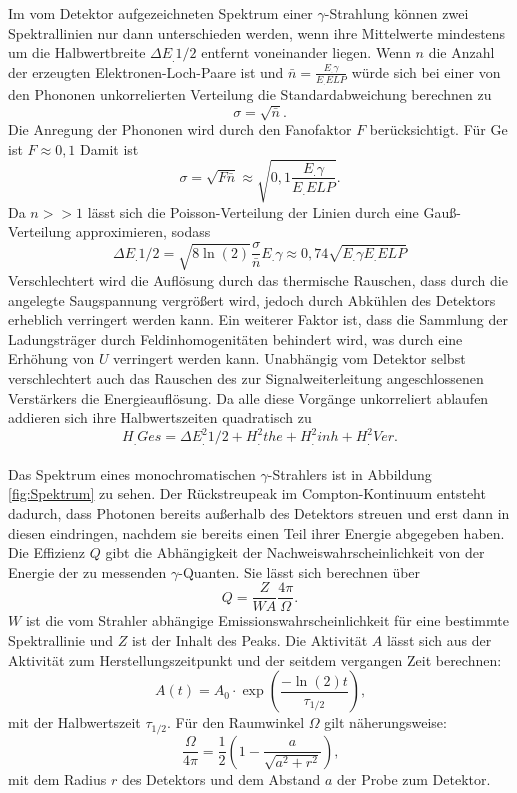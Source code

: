Im vom Detektor aufgezeichneten Spektrum einer $\gamma$-Strahlung können zwei Spektrallinien nur dann unterschieden werden, wenn ihre Mittelwerte mindestens um die Halbwertbreite $\Delta E_.{1/2}$ entfernt voneinander liegen.
Wenn $n$ die Anzahl der erzeugten Elektronen-Loch-Paare ist und $\bar{n}=\frac{E_.{\gamma}}{E_.{ELP}}$ würde sich bei einer von den Phononen unkorrelierten Verteilung die Standardabweichung berechnen zu
\[
\sigma=\sqrt{\bar{n}}\text{.}
\]
Die Anregung der Phononen wird durch den Fanofaktor $F$ berücksichtigt. Für Ge ist $F\approx 0,1$
Damit ist 
\[
\sigma=\sqrt{F\bar{n}}\approx\sqrt{0,1\frac{E_.{\gamma}}{E_.{ELP}}}\text{.}\label{eq:sig}
\]
Da $n>>1$ lässt sich die Poisson-Verteilung der Linien durch eine Gauß-Verteilung approximieren, sodass
\begin{equation}
\Delta E_.{1/2}=\sqrt{8\ln(2)}\frac{\sigma}{\bar{n}}E_.{\gamma}\approx 0,74\sqrt{E_.{\gamma}E_.{ELP}}\label{eq:dE}
\end{equation}
Verschlechtert wird die Auflösung durch das thermische Rauschen, dass durch die angelegte Saugspannung vergrößert wird, jedoch durch Abkühlen des Detektors erheblich verringert werden kann. Ein weiterer Faktor ist, dass die Sammlung der Ladungsträger durch Feldinhomogenitäten behindert wird, was durch eine Erhöhung von $U$ verringert werden kann. Unabhängig vom Detektor selbst verschlechtert auch das Rauschen des zur Signalweiterleitung angeschlossenen Verstärkers die Energieauflösung. Da alle diese Vorgänge unkorreliert ablaufen addieren sich ihre Halbwertszeiten quadratisch zu
\begin{equation}
H_.{Ges}=\Delta E^2_.{1/2} + H^2_.{the} + H^2_.{inh} + H^2_.{Ver}\text{.}
\end{equation}
\\
Das Spektrum eines monochromatischen $\gamma$-Strahlers ist in Abbildung \ref{fig:Spektrum} zu sehen.
Der Rückstreupeak im Compton-Kontinuum entsteht dadurch, dass Photonen bereits außerhalb des Detektors streuen und erst dann in diesen eindringen, nachdem sie bereits einen Teil ihrer Energie abgegeben haben.
Die Effizienz $Q$ gibt die Abhängigkeit der Nachweiswahrscheinlichkeit von der Energie der zu messenden $\gamma$-Quanten.
Sie lässt sich berechnen über
\begin{equation}
Q=\frac{Z}{W A}\frac{4\pi}{\Omega}\text{.}\label{eq:Q}
\end{equation}
$W$ ist die vom Strahler abhängige Emissionswahrscheinlichkeit für eine bestimmte Spektrallinie und $Z$ ist der Inhalt des Peaks.
Die Aktivität $A$ lässt sich aus der Aktivität zum Herstellungszeitpunkt und der seitdem vergangen Zeit berechnen:
\begin{equation}
A(t) = A_0\cdot \exp\left(\frac{-\ln(2)t}{\tau_{1/2}}\right)\text{,}\label{eq:A} 
\end{equation}
mit der Halbwertszeit $\tau_{1/2}$.
Für den Raumwinkel $\Omega$ gilt näherungsweise:
\begin{equation}
\frac{\Omega}{4\pi} = \frac{1}{2}\left(1-\frac{a}{\sqrt{a^2+r^2}}\right)\text{,}\label{eq:Omega}
\end{equation}
mit dem Radius $r$ des Detektors und dem Abstand $a$ der Probe zum Detektor.

